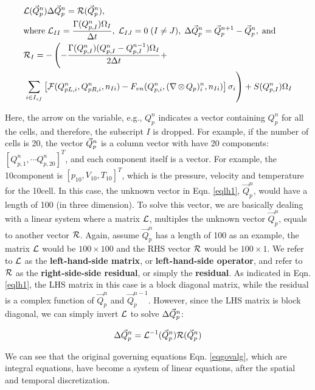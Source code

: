 \documentclass[12pt, letterpaper]{report}
\begin{document}
\begin{align}\label{eqlh1}
   \begin{split}
      & \mathcal{L}(\vec{Q}_p^n) \Delta \vec{Q}_p^n = \mathcal{R}(\vec{Q}_p^n), \\ & \textrm{where} \; \mathcal{L}_{II} =
      \frac{\Gamma(Q_{p,I}^n)\Omega_I}{\Delta t}, \; \mathcal{L}_{IJ} = 0 \; (I \neq J), \; \Delta \vec{Q}_p^n =
      \vec{Q}_p^{n+1} - \vec{Q}_p^n, \; \textrm{and } \\
      & \mathcal{R}_I = -\left(-\frac{\Gamma(Q_{p,I}^n) (Q_{p,I}^n - Q_{p,I}^{n-1})\Omega_I}{2\Delta t} +
         \right.\\
      &\left.\sum_{i \in
            I_{sf}}\left[\mathcal{F}(Q_{pL,i}^n, Q_{pR,i}^n, n_{Ii}) - F_{vn}(Q_{p,i}^n, (\nabla
\mathop{\otimes} Q_p)_i^n, n_{Ii})\right]\sigma_i\right) + S(Q_{p,I}^n)\Omega_I
   \end{split}
\end{align}

Here, the arrow on the variable, e.g., $Q_p^n$ indicates a vector containing $Q_p^n$ for all the
cells, and therefore, the subscript $I$ is dropped. For example, if the number of cells is 20, the
vector $\vec{Q}_p^n$ is a column vector with have 20 components: $[Q_{p,1}^n, \cdots Q_{p,20}^n]^T$, and
each component itself is a vector. For example, the 10\th component is $[p_{10}, V_{10}, T_{10}]^T$,
which is the pressure, velocity and temperature for the 10\th cell. In this case, the unknown vector
in Eqn.  \ref{eqlh1}, $\vec{Q}_p^n$, would have a length of 100 (in three dimension). To solve this
vector, we are basically dealing with a linear system where a matrix $\mathcal{L}$, multiples the unknown
vector $\vec{Q}_p^n$, equals to another vector $\mathcal{R}$. Again, assume $\vec{Q}_p^n$ has a length of 100
as an example, the matrix $\mathcal{L}$ would be $100 \times 100$ and the RHS vector $\mathcal{R}$ would be $100
\times 1$. We refer to $\mathcal{L}$ as the {\bf left-hand-side matrix}, or {\bf left-hand-side operator},
and refer to $\mathcal{R}$ as the {\bf right-side-side residual}, or simply the {\bf residual}. As indicated
in Eqn. \ref{eqlh1}, the LHS matrix in this case is a block diagonal matrix, while the residual is
a complex function of $\vec{Q}_p^n$ and $\vec{Q}_p^{n-1}$. However, since the LHS matrix is block
diagonal, we can simply invert $\mathcal{L}$ to solve $\Delta \vec{Q}_p^n$:

\begin{align*}
   \Delta \vec{Q}_p^n = \mathcal{L}^{-1}(\vec{Q}_p^n) \mathcal{R}(\vec{Q}_p^n)
\end{align*}

We can see that the original governing equations Eqn. \ref{eqgovalg}, which are integral equations, have
become a system of linear equations, after the spatial and temporal discretization. \paraspace
\end{document}

